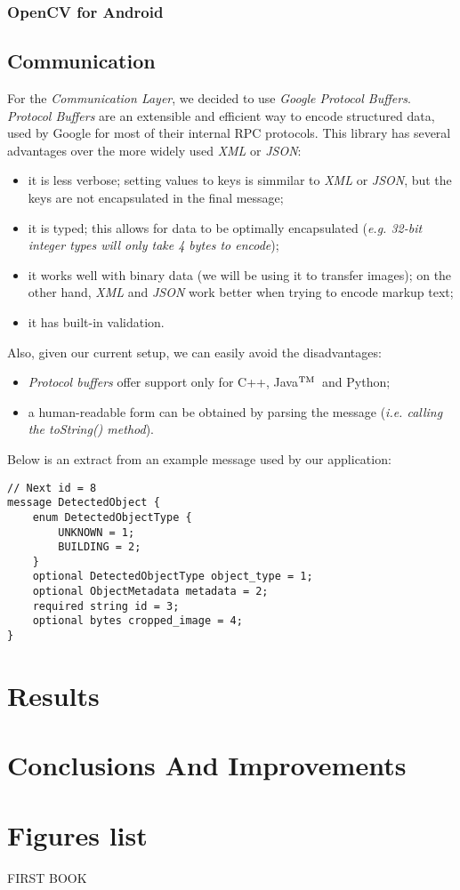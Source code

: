 \documentclass[a4paper,onecolumn,oneside,titlepage,12pt]{report}
\def\tm{\leavevmode\hbox{$\rm {}^{TM}$}}
\begin{document}
\subsection{OpenCV for Android}

\section{Communication}
For the \emph{Communication Layer}, we decided to use \emph{Google Protocol Buffers}. \emph{Protocol Buffers} are an extensible and efficient way to encode structured data, used by Google for most of their internal RPC protocols. This library has several advantages over the more widely used \emph{XML} or \emph{JSON}:
\begin{itemize}
	\item it is less verbose; setting values to keys is simmilar to \emph{XML} or \emph{JSON}, but the keys are not encapsulated in the final message;
	\item it is typed; this allows for data to be optimally encapsulated (\emph{e.g. 32-bit integer types will only take 4 bytes to encode});
	\item it works well with binary data (we will be using it to transfer images); on the other hand, \emph{XML} and \emph{JSON} work better when trying to encode markup text;
	\item it has built-in validation.
\end{itemize}
Also, given our current setup, we can easily avoid the disadvantages:
\begin{itemize}
	\item \emph{Protocol buffers} offer support only for C++, Java\tm\ and Python;
	\item a human-readable form can be obtained by parsing the message (\emph{i.e. calling the \emph{toString()} method}).
\end{itemize}

Below is an extract from an example message used by our application:
\lstset{
	language=Clean,
	basicstyle=\footnotesize,
	numbers=left,
	stepnumber=5
}
\begin{lstlisting}
// Next id = 8
message DetectedObject {
	enum DetectedObjectType {
		UNKNOWN = 1;
		BUILDING = 2;
	}
	optional DetectedObjectType object_type = 1;
	optional ObjectMetadata metadata = 2;
	required string id = 3;
	optional bytes cropped_image = 4;
}
\end{lstlisting}

\chapter{Results}

\chapter{Conclusions And Improvements}


\chapter{Figures list}

\begin{thebibliography}{9}
FIRST BOOK
\end{thebibliography}
\end{document}

